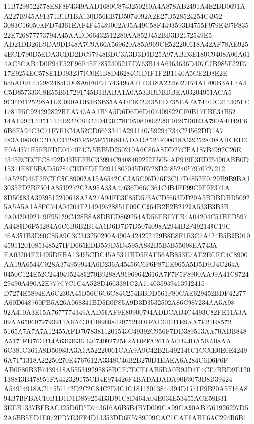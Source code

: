 \documentclass[UTF8,fontset=fandol,zihao=-4,a4paper]{ctexart}
\begin{document}
{{11B7298522578E8F8F4349AAD1680C8743250290A4A878AB2491A4E2BD0691AA227B945A91371B1B1BA130D56EB7D5074092A2E27D528524254C4952
3083C16050AFD74361EAF4F45489002A95A49C58F4493593D4755F979E497F83522E726877773794A45AADD66432512280AA8529452BD3D2172549E5
AD21DD26B9DA9DD48A7C9A66A569620A85A969CE522200618A42AF78AE9254ECD790D5EDA3CDD2DC97948BDC3A3D3D0D25A97ABD3E180C9408A06A61
4AC5CAB4D0F94F52F96F45F785240521ED763B14A6363636D407C0B985E22E717E9254EC578E1D0932371C0E1B8D46284C1D1F1F2B1140A5CE2D8E2E
655AD9E452982485ED08A6F6F7F743496A7171318A2225027074A1700B3AE7A3C5D857333C8E55B617291745B1BABA1A0A53DBDBDBEA03204951ACA5
9CFF6125298AD2C090ADB3B3B35AADF6C22435FDF35EAFA74400C214395FC1781F5C924292822BEA743AA1B7A5D6D6D6D407409822CF0B17FBE34B52
14AE99212B51142D2C2C84C2D4E3C78F95084092229F0B97D0E3A790A4B49F66B6FA94C3C71F7F1C4A52CD6673341A291140759294F34C21562DD1A7
483A49693CCDAC012893F5F5F55098DADADA521F00618A32C528498ABCED3F0A4571F5FBFDD0474F4C75BB5D250210A6C86A8DD27CBA187B4992C26E
4345ECECEC8492D43BEFBC33994C9408409222E5054AF919E3ED25490ABB0D15311E8F5BAD56284CEDEDED2911803045DE728D248524057970727212
4A528D46E3FCFC5C89002A15A6542CC3A5C96D76F3C17D4852F0429B9B9BA13035FD2BF501A8549272C2A95A33A47636D66C361C4B4FF99C9F9F371A
8D50983A3939512200618A2A27A94FE3F85D573ACD5663DD29A5BDBDBD50925A5A5A1A8FC74A04204F214949528851F09CC964B2B2B2120A533B3B3B
4A0420492149F95129C428B8A8DBED869254AD56EBF7FB4A04204C51BED597A4486D6F51284A6C6B6B2B14A6D6D7D7D5074098A2944B2F492149C19C
46A351B3D90C85A9C3C343250290A490A424292429B8E8F1E3C7A124B5B0B010459112010853485271FD665EDD559D5D4595A882B5B5B55098EA743A
EA03204F21495DEBA13495CDC45A5311BD5EAF56AB853E7AE2ECEC4C8900AA19A6544C928A374959944A6D236A45456C6F6F87DE965A5D5D9D4C264A
0450C124E52C24494952485270B9288A96969642616A7F7F5F8900AA99A41C872429490A490A2E777C7C1C4A528D4663381C2A114035939413912415
D7274E5894EA6C230A45D56C6C6C84C254BBDD561F80CAE629452BDF42277A60D648760FB5A26A068341BD5E0F85A9D3D3532502A86C987234AA5A98
92A410A3E05A7677774349AAD56AF9E80900794ADDCAB4C4493C82FE11A3A09AA6596979793914A6A6394B89008429752BD9FAC6DB1E9AA7E21B8572
5165A7A7A7A12455AFD70783811201543C49392C956F7DD389513AA70ABB848A5171ED763B14A6363636D4074092725E2ADFFA261AA0B44DA5BA08AA
6C381C361A8D50983A3A3A52220061CAA9A9C42B2B492146C1CC0E0E0E42496A7171318A22250270E4767612A3348C46B2B270D1EAEA6A284C6D6F6F
AB0F80B3B7439418A555349295858BCECECE6AB5DA0B93D4F4CF7BBD9E120138813B478951FA442329175CD4E974426F4BADADADA90F8073B8D39424
A54974918AC14551142D2C2C84C2D4C1C18112013844394D1571F9B20A5F16A894B7BFBAC10B1D1D1D859254B3D91C8D464A04E034E53455ACE58B31
3EEB1337BEBAC125D6D7D743616A6B6B4B7D009CA99CA90AB7761926297D52A6BB5ED1E072FD7E3FF4D11353DD6E5789009CAC1CAE8ABE6AC294B6B1
}}
\end{document}
